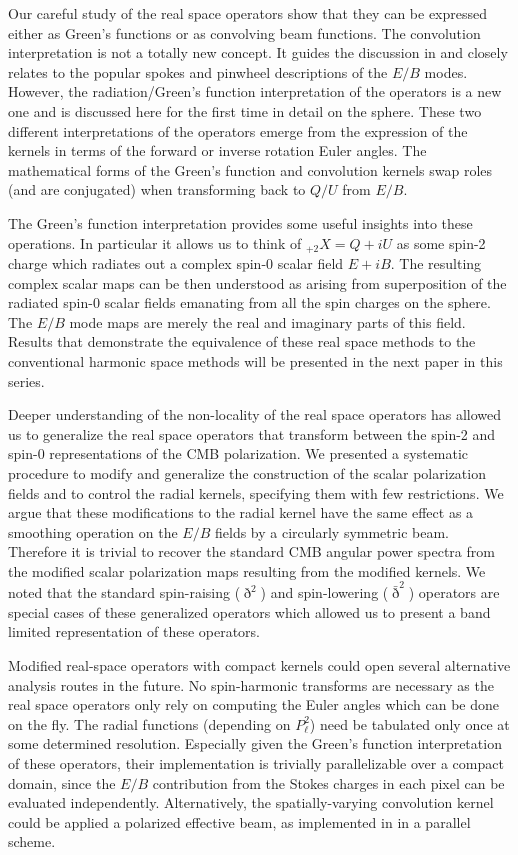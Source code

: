 Our careful study of the real space operators show that they can be expressed either as Green's functions or as convolving beam functions.  The convolution interpretation is not a totally new concept.  It guides the discussion in \cite{Zaldarriaga2001a,Chiueh2002} and closely relates to the popular spokes and pinwheel descriptions of the $E/B$ modes. However, the radiation/Green's function interpretation of the operators is a new one and is discussed here for the first time in detail on the sphere. These two different interpretations of the operators emerge from the expression of the kernels in terms of the forward or inverse rotation Euler angles.  The mathematical forms of the Green's function and convolution kernels swap roles (and are conjugated) when transforming back to $Q/U$ from $E/B$.

The Green's function interpretation provides some useful insights into these operations. In particular it allows us to think of ${}_{+2}X=Q+iU$ as some spin-2 charge which radiates out a complex spin-0 scalar field $E+iB$. The resulting complex scalar maps can be then understood as arising from superposition of the radiated spin-0 scalar fields emanating from all the spin charges on the sphere.  The $E/B$ mode maps are merely the real and imaginary parts of this field. Results that demonstrate the equivalence of these real space methods to the conventional harmonic space methods will be presented in the next paper in this series.

Deeper understanding of the non-locality of the real space operators has allowed us to generalize the real space operators that transform between the spin-2 and spin-0 representations of the CMB polarization. We presented a systematic procedure to modify and generalize the construction of the scalar polarization fields and to control the radial kernels, specifying them with few restrictions.  We argue that these modifications to the radial kernel have the same effect as a smoothing operation on the $E/B$ fields by a circularly symmetric beam.  Therefore it is trivial to recover the standard CMB angular power spectra from the modified scalar polarization maps resulting from the modified kernels.  We noted that the standard spin-raising ($\eth^2$) and spin-lowering ($\bar{\eth}^2$) operators are special cases of these generalized operators which allowed us to present a band limited representation of these operators. 

Modified real-space operators with compact kernels could open several alternative analysis routes in the future.  No spin-harmonic transforms are necessary as the real space operators only rely on computing the Euler angles which can be done on the fly.  The radial functions (depending on $P_{\ell}^{2}$) need be tabulated only once at some determined resolution.  Especially given the Green's function interpretation of these operators, their implementation is trivially parallelizable over a compact domain, since the $E/B$ contribution from the Stokes charges in each pixel can be evaluated independently.  Alternatively, the spatially-varying convolution kernel could be applied a polarized effective beam, as implemented in \cite{2011ApJS..193....5M} in a parallel scheme.

